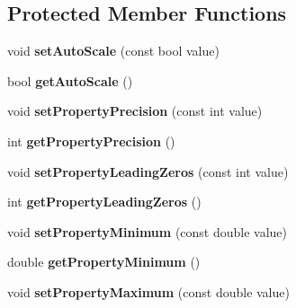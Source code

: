 \subsection*{Protected Member Functions}
\begin{DoxyCompactItemize}
\item 
\hypertarget{classQENumericEdit_a617ece9f34fdf00ac1ccf0fbeb7108a0}{
void {\bfseries setAutoScale} (const bool value)}
\label{classQENumericEdit_a617ece9f34fdf00ac1ccf0fbeb7108a0}

\item 
\hypertarget{classQENumericEdit_a549b328f435ae0e91d36e0a9d790f204}{
bool {\bfseries getAutoScale} ()}
\label{classQENumericEdit_a549b328f435ae0e91d36e0a9d790f204}

\item 
\hypertarget{classQENumericEdit_acf665f829b68397f7b6a10dd97a2353e}{
void {\bfseries setPropertyPrecision} (const int value)}
\label{classQENumericEdit_acf665f829b68397f7b6a10dd97a2353e}

\item 
\hypertarget{classQENumericEdit_ab9badbc5a5b875d4db34b70c23016ae5}{
int {\bfseries getPropertyPrecision} ()}
\label{classQENumericEdit_ab9badbc5a5b875d4db34b70c23016ae5}

\item 
\hypertarget{classQENumericEdit_a3cdb2bdb6cf4a9096bccc3e13c51df7e}{
void {\bfseries setPropertyLeadingZeros} (const int value)}
\label{classQENumericEdit_a3cdb2bdb6cf4a9096bccc3e13c51df7e}

\item 
\hypertarget{classQENumericEdit_a4159cb782d58bfe984c962173ce22c40}{
int {\bfseries getPropertyLeadingZeros} ()}
\label{classQENumericEdit_a4159cb782d58bfe984c962173ce22c40}

\item 
\hypertarget{classQENumericEdit_ad7825e74fc18005e51f277935d532480}{
void {\bfseries setPropertyMinimum} (const double value)}
\label{classQENumericEdit_ad7825e74fc18005e51f277935d532480}

\item 
\hypertarget{classQENumericEdit_a486a527396090cc700618ad61e3f6034}{
double {\bfseries getPropertyMinimum} ()}
\label{classQENumericEdit_a486a527396090cc700618ad61e3f6034}

\item 
\hypertarget{classQENumericEdit_ab5611a6345a2a96bb12d61bb7d4fce8b}{
void {\bfseries setPropertyMaximum} (const double value)}
\label{classQENumericEdit_ab5611a6345a2a96bb12d61bb7d4fce8b}


\end{DoxyCompactItemize}
